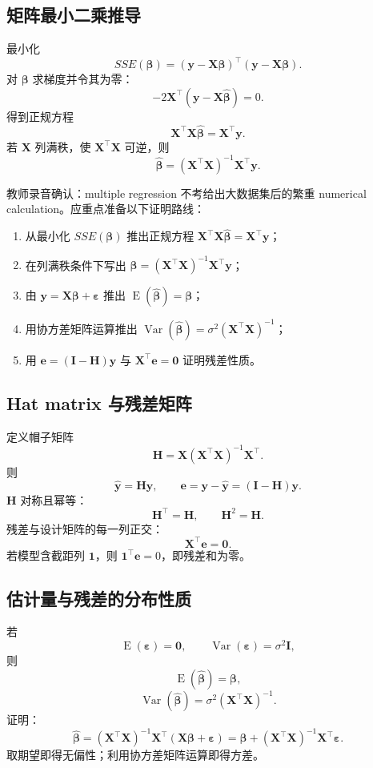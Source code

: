 \documentclass[11pt,a4paper]{article}
\newcommand{\E}{\operatorname{E}}
\newcommand{\Var}{\operatorname{Var}}
\newcommand{\1}{\mathbf{1}}
\newcommand{\by}{\mathbf{y}}
\newcommand{\bX}{\mathbf{X}}
\newcommand{\bH}{\mathbf{H}}
\newcommand{\bI}{\mathbf{I}}
\newcommand{\be}{\mathbf{e}}
\newcommand{\bbeta}{\boldsymbol{\beta}}
\newcommand{\bvarepsilon}{\boldsymbol{\varepsilon}}
\begin{document}
\subsection{矩阵最小二乘推导}

最小化
\[
  SSE(\bbeta)
  =
  (\by-\bX\bbeta)^\top(\by-\bX\bbeta).
\]
对 $\bbeta$ 求梯度并令其为零：
\[
  -2\bX^\top(\by-\bX\hat{\bbeta})=0.
\]
得到正规方程
\[
  \boxed{\bX^\top\bX\hat{\bbeta}=\bX^\top\by.}
\]
若 $\bX$ 列满秩，使 $\bX^\top\bX$ 可逆，则
\[
  \boxed{
  \hat{\bbeta}
  =
  (\bX^\top\bX)^{-1}\bX^\top\by.
  }
\]

\begin{methodbox}[多元回归理论证明题]
教师录音确认：multiple regression 不考给出大数据集后的繁重 numerical calculation。应重点准备以下证明路线：
\begin{enumerate}
  \item 从最小化 $SSE(\bbeta)$ 推出正规方程 $\bX^\top\bX\hat{\bbeta}=\bX^\top\by$；
  \item 在列满秩条件下写出 $\hat{\bbeta}=(\bX^\top\bX)^{-1}\bX^\top\by$；
  \item 由 $\by=\bX\bbeta+\bvarepsilon$ 推出 $\E(\hat{\bbeta})=\bbeta$；
  \item 用协方差矩阵运算推出 $\Var(\hat{\bbeta})=\sigma^2(\bX^\top\bX)^{-1}$；
  \item 用 $\be=(\bI-\bH)\by$ 与 $\bX^\top\be=\mathbf0$ 证明残差性质。
\end{enumerate}
\end{methodbox}

\subsection{Hat matrix 与残差矩阵}

定义帽子矩阵
\[
  \boxed{
  \bH=\bX(\bX^\top\bX)^{-1}\bX^\top.
  }
\]
则
\[
  \hat{\by}=\bH\by,
  \qquad
  \be=\by-\hat{\by}=(\bI-\bH)\by.
\]
$\bH$ 对称且幂等：
\[
  \bH^\top=\bH,
  \qquad
  \bH^2=\bH.
\]
残差与设计矩阵的每一列正交：
\[
  \boxed{\bX^\top\be=\mathbf 0.}
\]
若模型含截距列 $\1$，则 $\1^\top\be=0$，即残差和为零。

\subsection{估计量与残差的分布性质}

若
\[
  \E(\bvarepsilon)=\mathbf0,
  \qquad
  \Var(\bvarepsilon)=\sigma^2\bI,
\]
则
\[
  \boxed{\E(\hat{\bbeta})=\bbeta,}
\]
\[
  \boxed{
  \Var(\hat{\bbeta})
  =
  \sigma^2(\bX^\top\bX)^{-1}.
  }
\]
证明：
\[
  \hat{\bbeta}
  =
  (\bX^\top\bX)^{-1}\bX^\top(\bX\bbeta+\bvarepsilon)
  =
  \bbeta+(\bX^\top\bX)^{-1}\bX^\top\bvarepsilon.
\]
取期望即得无偏性；利用协方差矩阵运算即得方差。
\end{document}

